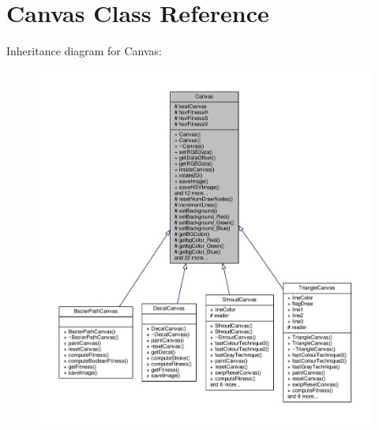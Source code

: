 \hypertarget{classCanvas}{}\section{Canvas Class Reference}
\label{classCanvas}


Inheritance diagram for Canvas\+:
\nopagebreak
\begin{figure}[H]
\begin{center}
\leavevmode
\includegraphics[width=350pt]{classCanvas__inherit__graph}
\end{center}
\end{figure}


